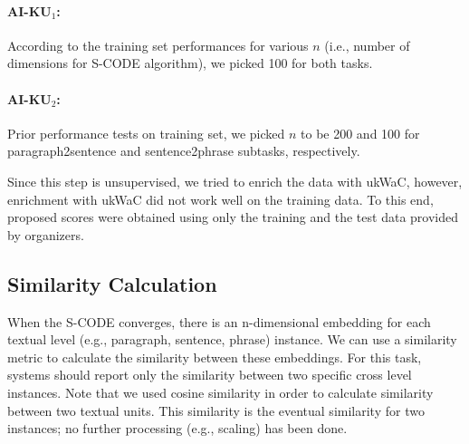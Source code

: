 \documentclass[11pt]{article}
\begin{document}
\paragraph{AI-KU$_1$:} According to the training set performances for various $n$ (i.e., number of dimensions for S-CODE algorithm), we picked 100 for both tasks.



\begin{table}[hl]
\begin{center}
\end{center}
\caption{\label{table:results-p2s-train} Paragraph-2-Sentence subtask scores for the training data. Subscripts in AI-KU systems specify the run number.}
\end{table}



\paragraph{AI-KU$_2$:} Prior performance tests on training set, we picked $n$ to be 200 and 100 for paragraph2sentence and sentence2phrase subtasks, respectively.


Since this step is unsupervised, we tried to enrich the data with ukWaC, however, enrichment with ukWaC did not work well on the training data. To this end, proposed scores were obtained using only the training and the test data provided by organizers.


\subsection{Similarity Calculation}

When the S-CODE converges, there is an n-dimensional embedding for each textual level (e.g., paragraph, sentence, phrase) instance. We can use a similarity metric to calculate 
the similarity between these embeddings. For this task, systems should report only the similarity between two specific cross level instances. Note that we used cosine similarity in order to calculate similarity between two textual units. This similarity is the eventual similarity for two instances; no further processing (e.g., scaling) has been done.
\end{document}
